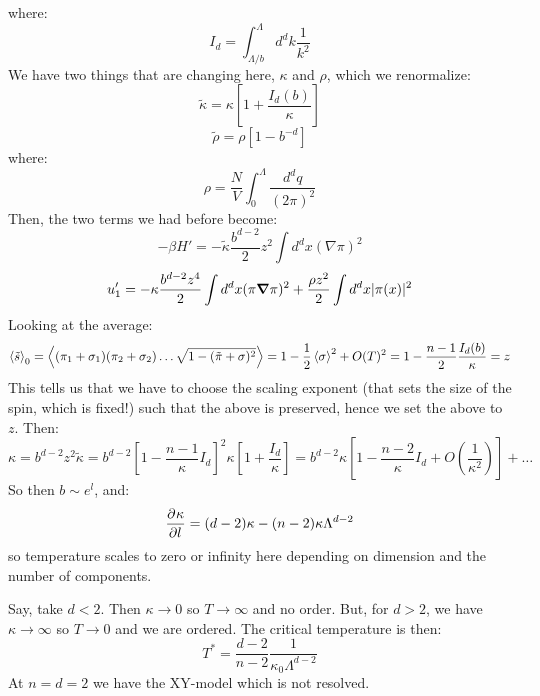 where:
\begin{equation}
    I_d = \int_{\Lambda/b}^\Lambda d^dk \frac{1}{k^2}
\end{equation}
We have two things that are changing here, $\kappa$ and $\rho$, which we renormalize:
\begin{equation}
    \tilde{\kappa} = \kappa\left[1 + \frac{I_d(b)}{\kappa}\right]
\end{equation}
\begin{equation}
    \tilde{\rho} = \rho[1 - b^{-d}]
\end{equation}
where:
\begin{equation}
    \rho = \frac{N}{V}\int_0^\Lambda \frac{d^dq}{(2\pi)^2}
\end{equation}
Then, the two terms we had before become:
\begin{equation}
    -\beta H' = -\tilde{\kappa}\frac{b^{d-2}}{2}z^2 \int d^d x (\nabla\pi)^2
\end{equation}
\begin{equation}
    u_1' = -\kappa\frac{b^{d-2}z^4}{2}\int d^dx (\pi \nabla \pi)^2 + \frac{\rho z^2}{2}\int d^dx \abs{\pi(x)}^2
\end{equation}
Looking at the average:
\begin{equation}
    \left< \tilde{s} \right>_0 = \left< (\pi_1 + \sigma_1)(\pi_2 + \sigma_2)\ldots \sqrt{1 - (\tilde{\pi} + \sigma)^2} \right> = 1 - \frac{1}{2}\left< \sigma \right>^2 + O(T)^2 = 1 - \frac{n-1}{2}\frac{I_d(b)}{\kappa} = z
\end{equation}
This tells us that we have to choose the scaling exponent (that sets the size of the spin, which is fixed!) such that the above is preserved, hence we set the above to $z$. Then:
\begin{equation}
    \kappa = b^{d-2}z^2\tilde{\kappa} = b^{d-2}\left[1 - \frac{n-1}{\kappa}I_d\right]^2\kappa\left[1 + \frac{I_d}{\kappa}\right] = b^{d-2}\kappa\left[1 - \frac{n-2}{\kappa}I_d + O(\frac{1}{\kappa^2})\right] + \ldots
\end{equation}
So then $b \sim e^{l}$, and:
\begin{equation}
    \dpd{\kappa}{l} = (d-2)\kappa - (n - 2)\kappa \Lambda^{d-2}
\end{equation}
so temperature scales to zero or infinity here depending on dimension and the number of components.

Say, take $d < 2$. Then $\kappa \to 0$ so $T \to \infty$ and no order. But, for $d > 2$, we have $\kappa \to \infty$ so $T \to 0$ and we are ordered. The critical temperature is then:
\begin{equation}
    T^* = \frac{d-2}{n-2}\frac{1}{\kappa_0\Lambda^{d-2}}
\end{equation}
At $n = d = 2$ we have the XY-model which is not resolved. 

